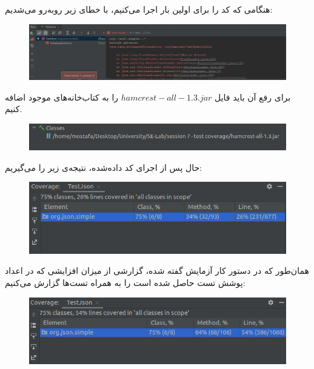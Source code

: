 
هنگامی که کد را برای اولین بار اجرا می‌کنیم، با خطای زیر رو‌به‌رو می‌شدیم:
\begin{figure}[!hbpt]
	\includegraphics[width=\linewidth]{./img/error.png}
\end{figure}

برای رفع آن باید فایل 
$hamcrest-all-1.3.jar$ 
را به کتاب‌خانه‌های موجود اضافه کنیم.

\begin{figure}[!hbpt]
	\includegraphics[width=\linewidth]{./img/1.png}
\end{figure}

حال پس از اجرای کد داده‌شده، نتیجه‌ی زیر را می‌گیریم:
\begin{figure}[!hbpt]
	\includegraphics[width=\linewidth]{./img/2.png}
\end{figure}

همان‌طور که در دستور کار آزمایش گفته شده، گزارشی از میزان افزایشی که در اعداد پوشش تست حاصل شده است را به همراه تست‌ها گزارش می‌کنیم:

\begin{figure}[!hbpt]
	\includegraphics[width=\linewidth]{./img/3.png}
\end{figure}

